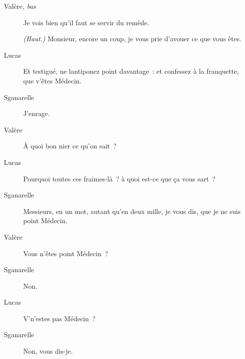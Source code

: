 \documentclass[french,twoside]{book} %
\begin{document}
 \begin{description} \item[Valère\textit{, bas}\par
] 

Je vois bien qu’il faut se servir du remède.

\textit{(Haut.)} Monsieur, encore un coup, je vous prie d’avouer ce que vous êtes.\end{description}
 \begin{description} \item[Lucas] 

Et testigué, ne lantiponez point davantage : et confessez à la franquette, que v’êtes Médecin.\end{description}
 \begin{description} \item[Sganarelle] 

J’enrage.\end{description}
 \begin{description} \item[Valère] 

À quoi bon nier ce qu’on sait ?\end{description}
 \begin{description} \item[Lucas] 

Pourquoi toutes ces fraimes-là ? à quoi est-ce que ça vous sart ?\end{description}
 \begin{description} \item[Sganarelle] 

Messieurs, en un mot, autant qu’en deux mille, je vous dis, que je ne suis point Médecin.\end{description}
 \begin{description} \item[Valère] 

Vous n’êtes point Médecin ?\end{description}
 \begin{description} \item[Sganarelle] 

Non.\end{description}
 \begin{description} \item[Lucas] 

V’n’estes pas Médecin ?\end{description}
 \begin{description} \item[Sganarelle] 

Non, vous dis-je.\end{description}
\end{document}

